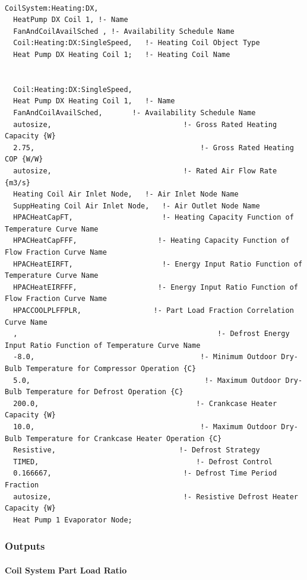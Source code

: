 \begin{lstlisting}

CoilSystem:Heating:DX,
  HeatPump DX Coil 1, !- Name
  FanAndCoilAvailSched , !- Availability Schedule Name
  Coil:Heating:DX:SingleSpeed,   !- Heating Coil Object Type
  Heat Pump DX Heating Coil 1;   !- Heating Coil Name


  Coil:Heating:DX:SingleSpeed,
  Heat Pump DX Heating Coil 1,   !- Name
  FanAndCoilAvailSched,       !- Availability Schedule Name
  autosize,                               !- Gross Rated Heating Capacity {W}
  2.75,                                       !- Gross Rated Heating COP {W/W}
  autosize,                               !- Rated Air Flow Rate {m3/s}
  Heating Coil Air Inlet Node,   !- Air Inlet Node Name
  SuppHeating Coil Air Inlet Node,   !- Air Outlet Node Name
  HPACHeatCapFT,                     !- Heating Capacity Function of Temperature Curve Name
  HPACHeatCapFFF,                   !- Heating Capacity Function of Flow Fraction Curve Name
  HPACHeatEIRFT,                     !- Energy Input Ratio Function of Temperature Curve Name
  HPACHeatEIRFFF,                   !- Energy Input Ratio Function of Flow Fraction Curve Name
  HPACCOOLPLFFPLR,                 !- Part Load Fraction Correlation Curve Name
  ,                                               !- Defrost Energy Input Ratio Function of Temperature Curve Name
  -8.0,                                       !- Minimum Outdoor Dry-Bulb Temperature for Compressor Operation {C}
  5.0,                                         !- Maximum Outdoor Dry-Bulb Temperature for Defrost Operation {C}
  200.0,                                     !- Crankcase Heater Capacity {W}
  10.0,                                       !- Maximum Outdoor Dry-Bulb Temperature for Crankcase Heater Operation {C}
  Resistive,                             !- Defrost Strategy
  TIMED,                                     !- Defrost Control
  0.166667,                               !- Defrost Time Period Fraction
  autosize,                               !- Resistive Defrost Heater Capacity {W}
  Heat Pump 1 Evaporator Node;
\end{lstlisting}

\subsubsection{Outputs}\label{outputs-20}

\paragraph{Coil System Part Load Ratio}\label{coil-system-part-load-ratio-1}

